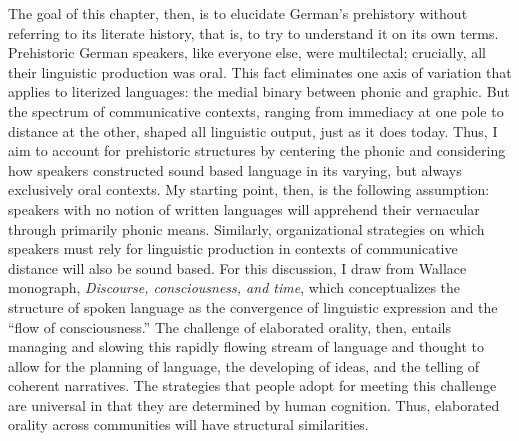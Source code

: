 The goal of this chapter, then, is to elucidate German’s prehistory without referring to its literate history, that is, to try to understand it on its own terms. Prehistoric German speakers, like everyone else, were multilectal; crucially, all their linguistic production was oral. This fact eliminates one axis of variation that applies to literized languages: the medial binary between phonic and graphic. But the spectrum of communicative contexts, ranging from immediacy at one pole to distance at the other, shaped all linguistic output, just as it does today. Thus, I aim to account for prehistoric structures by centering the phonic and considering how speakers constructed sound based language in its varying, but always exclusively oral contexts. My starting point, then, is the following assumption: speakers with no notion of written languages will apprehend their vernacular through primarily phonic means. Similarly, organizational strategies on which speakers must rely for linguistic production in contexts of communicative distance will also be sound based. For this discussion, I draw from Wallace  monograph, \textit{Discourse, consciousness, and time}, which conceptualizes the structure of spoken language as the convergence of linguistic expression and the “flow of consciousness.” The challenge of elaborated orality, then, entails managing and slowing this rapidly flowing stream of language and thought to allow for the planning of language, the developing of ideas, and the telling of coherent narratives. The strategies that people adopt for meeting this challenge are universal in that they are determined by human cognition. Thus, elaborated orality across communities will have structural similarities.

